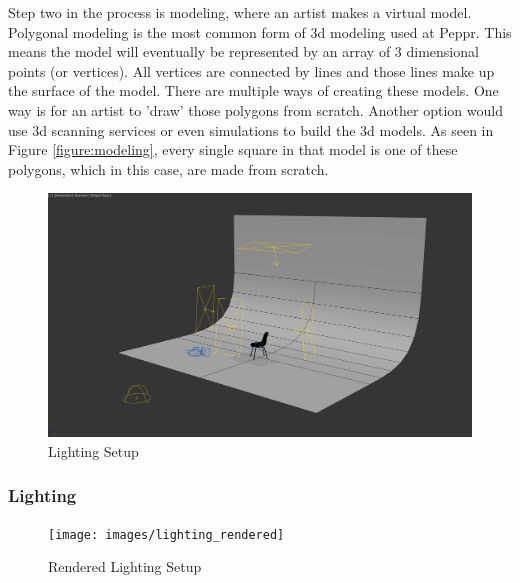 Step two in the process is modeling, where an artist makes a virtual model. Polygonal modeling is the most common form of 3d modeling used at Peppr. This means the model will eventually be represented by an array of 3 dimensional points (or vertices). All vertices are connected by lines and those lines make up the surface of the model. There are multiple ways of creating these models. One way is for an artist to 'draw' those polygons from scratch. Another option would use 3d scanning services or even simulations to build the 3d models.
As seen in Figure \ref{figure:modeling}, every single square in that model is one of these polygons, which in this case, are made from scratch.

\clearpage
\begin{figure}
\centering
\includegraphics[width=15cm]{images/lighting}
\caption{Lighting Setup}
\label{figure:lighting}
\end{figure}


\subsubsection{Lighting}

\begin{figure}
\vspace{-1cm}
\centering
\texttt{[image: images/lighting\_rendered]}
\caption{Rendered Lighting Setup}
\label{figure:lighting_rendered}
\end{figure}

